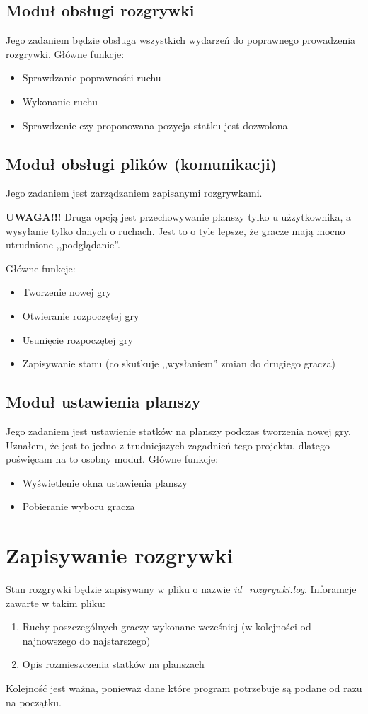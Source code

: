 \documentclass[a4paper]{article}
\begin{document}
\subsection{Moduł obsługi rozgrywki}
Jego zadaniem będzie obsługa wszystkich wydarzeń do poprawnego prowadzenia rozgrywki.
Główne funkcje:
\begin{itemize}
	\item Sprawdzanie poprawności ruchu
	\item Wykonanie ruchu
	\item Sprawdzenie czy proponowana pozycja statku jest dozwolona
\end{itemize}

\subsection{Moduł obsługi plików (komunikacji)}
Jego zadaniem jest zarządzaniem zapisanymi rozgrywkami.


{\bf UWAGA!!!} Druga opcją jest przechowywanie planszy tylko u użzytkownika, a wysyłanie tylko danych o ruchach.
Jest to o tyle lepsze, że gracze mają mocno utrudnione ,,podglądanie''.

Główne funkcje:
\begin{itemize}
	\item Tworzenie nowej gry
	\item Otwieranie rozpoczętej gry
	\item Usunięcie rozpoczętej gry
	\item Zapisywanie stanu (co skutkuje ,,wysłaniem'' zmian do drugiego gracza)
\end{itemize}

\subsection{Moduł ustawienia planszy}
Jego zadaniem jest ustawienie statków na planszy podczas tworzenia nowej gry.
Uznałem, że jest to jedno z trudniejszych zagadnień tego projektu, dlatego poświęcam na to osobny moduł.
Główne funkcje:
\begin{itemize}
	\item Wyświetlenie okna ustawienia planszy
	\item Pobieranie wyboru gracza
\end{itemize}

\section{Zapisywanie rozgrywki}
Stan rozgrywki będzie zapisywany w pliku o nazwie \emph{id\_rozgrywki.log}.
Inforamcje zawarte w takim pliku:
\begin{enumerate}
	\item Ruchy poszczególnych graczy wykonane wcześniej (w kolejności od najnowszego do najstarszego)
	\item Opis rozmieszczenia statków na planszach
\end{enumerate}
Kolejność jest ważna, ponieważ dane które program potrzebuje są podane od razu na początku.
\end{document}
